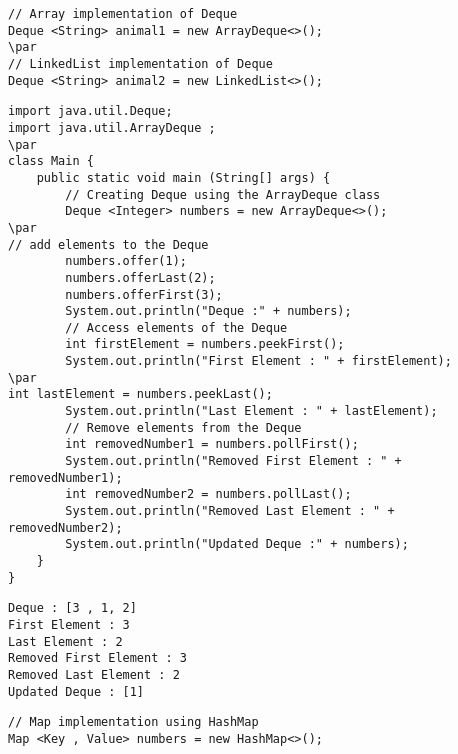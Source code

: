 \documentclass{book}
\def\lthtmlcheckvsize{\ifdim\ht\sizebox<\vsize 
  \ifdim\wd\sizebox<\hsize\expandafter\hfill\fi \expandafter\vfill
  \else\expandafter\vss\fi}%
\begin{document}
{\newpage\clearpage
{}%
\begin{lstlisting}
// Array implementation of Deque
Deque <String> animal1 = new ArrayDeque<>();
\par
// LinkedList implementation of Deque
Deque <String> animal2 = new LinkedList<>();
\end{lstlisting}%
\lthtmlfigureZ
\lthtmlcheckvsize\clearpage}

{\newpage\clearpage
{}%
\begin{lstlisting}
import java.util.Deque;
import java.util.ArrayDeque ;
\par
class Main {
	public static void main (String[] args) {
		// Creating Deque using the ArrayDeque class
		Deque <Integer> numbers = new ArrayDeque<>();
\par
// add elements to the Deque
		numbers.offer(1);
		numbers.offerLast(2);
		numbers.offerFirst(3);
		System.out.println("Deque :" + numbers);
		// Access elements of the Deque
		int firstElement = numbers.peekFirst();
		System.out.println("First Element : " + firstElement);
\par
int lastElement = numbers.peekLast();
		System.out.println("Last Element : " + lastElement);
		// Remove elements from the Deque
		int removedNumber1 = numbers.pollFirst();
		System.out.println("Removed First Element : " + removedNumber1);
		int removedNumber2 = numbers.pollLast();
		System.out.println("Removed Last Element : " + removedNumber2);
		System.out.println("Updated Deque :" + numbers);
	}
}
\end{lstlisting}%
\lthtmlfigureZ
\lthtmlcheckvsize\clearpage}

{\newpage\clearpage
{}%
\begin{lstlisting}
Deque : [3 , 1, 2]
First Element : 3
Last Element : 2
Removed First Element : 3
Removed Last Element : 2
Updated Deque : [1]
\end{lstlisting}%
\lthtmlfigureZ
\lthtmlcheckvsize\clearpage}

{\newpage\clearpage
{}%
\begin{lstlisting}
// Map implementation using HashMap
Map <Key , Value> numbers = new HashMap<>();
\end{lstlisting}%
\lthtmlfigureZ
\lthtmlcheckvsize\clearpage}
\end{document}
